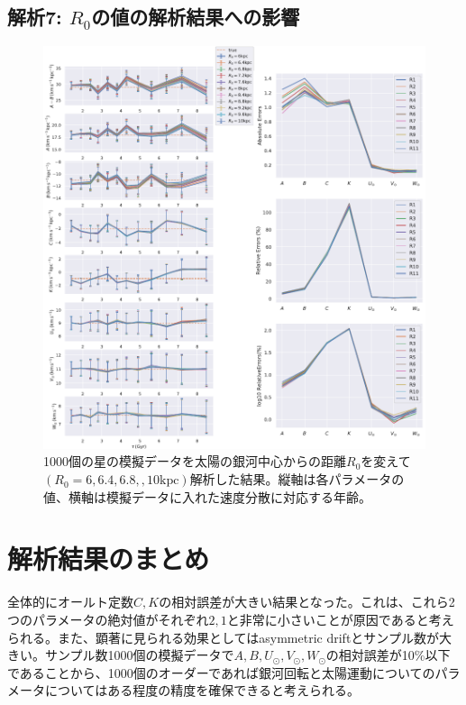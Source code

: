 \subsection{解析7: $R_0$の値の解析結果への影響}
\begin{figure}[htbp]
	\centering
	\includegraphics[width=15cm]{fig/Mock_R0.pdf}
	\caption{1000個の星の模擬データを太陽の銀河中心からの距離$R_0$を変えて$(R_0 = 6,6.4,6.8,,10 \mathrm{kpc})$解析した結果。縦軸は各パラメータの値、横軸は模擬データに入れた速度分散に対応する年齢。} \label{fig:Mock_R0}
\end{figure}

\section{解析結果のまとめ}
全体的にオールト定数$C,K$の相対誤差が大きい結果となった。これは、これら2つのパラメータの絶対値がそれぞれ$2,1$と非常に小さいことが原因であると考えられる。また、顕著に見られる効果としてはasymmetric driftとサンプル数が大きい。サンプル数1000個の模擬データで$A,B,U_{\odot},V_{\odot},W_{\odot}$の相対誤差が10\%以下であることから、1000個のオーダーであれば銀河回転と太陽運動についてのパラメータについてはある程度の精度を確保できると考えられる。